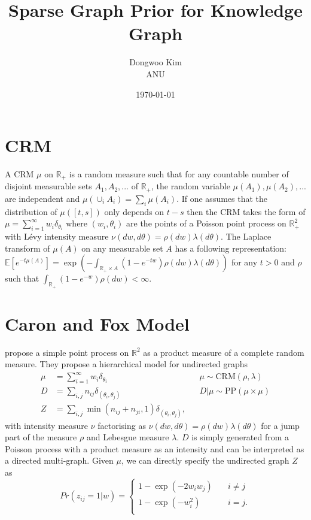 \documentclass{article}
\title{Sparse Graph Prior for Knowledge Graph}
\date{\today}
\author{Dongwoo Kim\\ANU}
\begin{document}
\maketitle

\section{CRM}
A CRM $\mu$ on $\mathbb{R}_+$ is a random measure such that for any countable number of disjoint measurable sets $A_1, A_2, ...$ of $\mathbb{R}_+$, the random variable $\mu(A_1), \mu(A_2), ...$ are independent and $\mu(\cup_i A_i) = \sum_i \mu(A_i)$. If one assumes that the distribution of $\mu([t,s])$ only depends on $t-s$ then the CRM takes the form of $\mu = \sum_{i=1}^{\infty}w_i\delta_{\theta_i}$ where $(w_i, \theta_i)$ are the points of a Poisson point process on $\mathbb{R}_+^2$ with L\'{e}vy intensity measure $\nu(dw, d\theta) = \rho(dw)\lambda(d\theta)$. The Laplace transform of $\mu(A)$ on any measurable set $A$ has a following representation: $\mathbb{E}[e^{-t\mu(A)}] = \exp(-\int_{\mathbb{R}_+ \times A}(1-e^{-tw})\rho(dw)\lambda(d\theta))$ for any $t>0$ and $\rho$ such that $\int_{\mathbb{R}_+}(1-e^{-w})\rho(dw) < \infty$.

\section{Caron and Fox Model}

\cite{Caron2015} propose a simple point process on $\mathbb{R}^2$ as a product measure of a complete random measure. They propose a hierarchical model for undirected graphs
\begin{align}
\mu &= \sum_{i=1}^{\infty} w_i \delta_{\theta_i} & &\mu \sim \text{CRM}(\rho, \lambda)\\
D &= \sum_{i,j} n_{ij} \delta_{(\theta_i, \theta_j)} & &D|\mu \sim \text{PP}(\mu \times \mu)\\
Z &=\sum_{i,j} \min(n_{ij} + n_{ji}, 1)\delta_{(\theta_i, \theta_j)}, \label{eqn:cnf}&&
\end{align}
with intensity measure $\nu$ factorising as $\nu(dw, d\theta) = \rho(dw) \lambda(d\theta)$ for a jump part of the measure $\rho$ and Lebesgue measure $\lambda$. $D$ is simply generated from a Poisson process with a product measure as an intensity and can be interpreted as a directed multi-graph.
Given $\mu$, we can directly specify the undirected graph $Z$ as
\[ Pr(z_{ij}=1|w) = 
  \begin{cases}
    1 - \exp(-2w_iw_j)       & \quad i \neq j\\
    1 - \exp(-w_i^2) & \quad i = j.\\
  \end{cases}
\]
\end{document}
